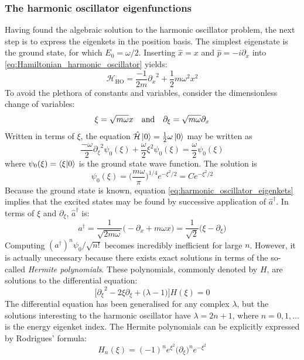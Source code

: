 \documentclass[nofootinbib,reprint,english]{revtex4-1}
\newcommand{\hatHH}{\hat{\mathcal{H}}}
\newcommand{\HH}{\mathcal{H}}
\begin{document}
\subsubsection{The harmonic oscillator eigenfunctions}
Having found the algebraic solution to the harmonic oscillator problem, the next step is to express the eigenkets in the position basis. The simplest eigenstate is the ground state, for which \(E_0=\omega/2\). Inserting \(\hat{x}=x\) and \(\hat{p}=-i\partial_x\) into \eqref{eq:Hamiltonian_harmonic_oscillator} yields:
\[\HH_\text{HO}=\frac{-1}{2m}{\partial_x}^2+\frac{1}{2}m\omega^2x^2\]
To avoid the plethora of constants and variables, consider the dimensionless change of variables:
\[\xi=\sqrt{m\omega}x\qand\partial_\xi=\sqrt{m\omega}\partial_x\]
Written in terms of \(\xi\), the equation \(\hatHH\ket{0}=\frac{1}{2}\omega\ket{0}\) may be written as
\[\frac{-\omega}{2}{\partial_\xi}^2\psi_0(\xi)+\frac{\omega}{2}\xi^2\psi_0(\xi)=\frac{\omega}{2}\psi_0(\xi)\]
where \(\psi_0(\xi)=\braket{\xi}{0}\) is the ground state wave function. The solution is
\begin{equation}\label{eq:harmonic_oscillator_ground_state_position_basis}
\psi_0(\xi)=\bigg(\frac{m\omega}{\pi}\bigg)^{1/4}e^{-\xi^2/2}=Ce^{-\xi^2/2}
\end{equation}
Because the ground state is known, equation \eqref{eq:harmonic_oscillator_eigenkets} implies that the excited states may be found by successive application of \(\hat{a}^\dagger\). In terms of \(\xi\) and \(\partial_\xi\), \(\hat{a}^\dagger\) is:
\[a^\dagger=\frac{1}{\sqrt{2m\omega}}\big(-\partial_x+m\omega x\big)=\frac{1}{\sqrt{2}}\big(\xi-\partial_\xi\big)\]
Computing \((a^\dagger)^n\psi_0/\sqrt{n!}\) becomes incredibly inefficient for large \(n\). However, it is actually unecessary because there exists exact solutions in terms of the so-called \emph{Hermite polynomials}. These polynomials, commonly denoted by \(H\), are solutions to the differential equation:
\begin{equation}\label{eq:Hermite_differential_equation}
\bigg[{\partial_\xi}^2-2\xi\partial_\xi+\big(\lambda-1\big)\bigg]H(\xi)=0
\end{equation}
The differential equation has been generalised for any complex \(\lambda\), but the solutions interesting to the harmonic oscillator have \(\lambda=2n+1\), where \(n=0,1,\ldots\) is the energy eigenket index. The Hermite polynomials can be explicitly expressed by Rodrigues' formula:
\begin{equation}\label{eq:Hermite_polynomials_Rodrigues_Formula}
H_n(\xi)=(-1)^ne^{\xi^2}\big(\partial_\xi\big)^ne^{-\xi^2}
\end{equation}
\end{document}
